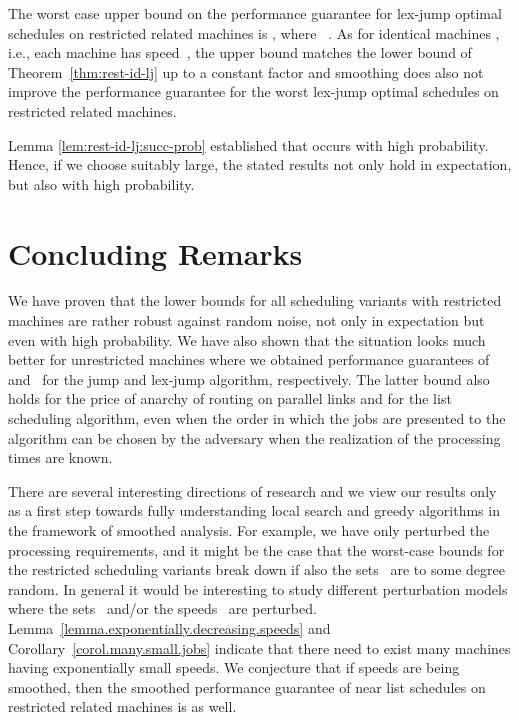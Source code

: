 \documentclass[a4paper,11pt,fleqn]{article}
\begin{document}
\begin{remark}
The worst case upper bound on the performance guarantee for
lex-jump optimal schedules on restricted related machines is
, where ~\cite{Rutten:etal:2012}.
As for identical machines , i.e., each machine has speed~, the
upper bound matches the lower bound of Theorem~\ref{thm:rest-id-lj} up
to a constant factor and smoothing does also not improve the performance
guarantee for the worst lex-jump optimal schedules on restricted related
machines.

Lemma \ref{lem:rest-id-lj:succ-prob} established that  occurs with high probability. Hence, if we choose  suitably large, the stated results not only hold in expectation, but also with high probability.
\end{remark}




\section{Concluding Remarks}
\label{sec:concluding}

We have proven that the lower bounds for all scheduling variants with restricted machines
are rather robust against random noise, not only in expectation but even with high probability. We have also shown that the situation looks much
better for unrestricted machines where we obtained performance guarantees of~ and~ for the jump and lex-jump algorithm, respectively.
The latter bound also holds for the price of anarchy of routing on parallel links and
for the list scheduling algorithm, even when the order in which the jobs are presented to the algorithm can be chosen by the adversary when the realization of the processing times are known.

There are several interesting directions of research and we view our results
only as a first step towards fully understanding local search and greedy algorithms
in the framework of smoothed analysis. For example, we have only
perturbed the processing requirements, and it might be the case that the worst-case
bounds for the restricted scheduling variants break down if also the sets~
are to some degree random. In general it would be interesting to study different
perturbation models where the sets~ and/or the speeds~ are perturbed. 
Lemma~\ref{lemma.exponentially.decreasing.speeds} and Corollary~\ref{corol.many.small.jobs} indicate that there need to exist many machines having exponentially small speeds. We conjecture that if speeds are being smoothed, then the smoothed performance guarantee of near list schedules on restricted related machines is  as well.
\end{document}
